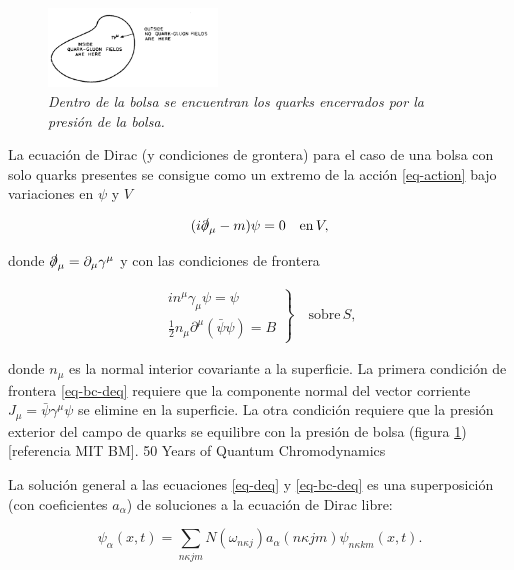 \begin{figure}
\centering
\includegraphics[width=0.4\textwidth]{./Images/Bag model BC.png}
\caption[Diagrama de bolsa con condiciones de grontera]{\emph{Dentro de la bolsa se encuentran los quarks encerrados por la presión de la bolsa.}}
\label{fig: Bolsa BC}
\end{figure}

La ecuación de Dirac (y condiciones de grontera) para el caso de una bolsa con solo quarks presentes se consigue como un extremo de la acción \eqref{eq-action} bajo variaciones en $\psi$ y $V$

\begin{equation}\label{eq-deq}
( i \slashed{\partial}_{\mu} - m) \psi= 0 \quad \mathrm{en} \, V,
\end{equation}

donde $\slashed{\partial}_{\mu} = {\partial}_{\mu} {\gamma}^{\mu}$ y con las condiciones de frontera

\begin{eqnarray}\label{eq-bc-deq}
\left.
\begin{array}{c}
i {n}^{\mu} {\gamma}_{\mu} \psi = \psi \\ 
\frac{1}{2} {n}_{\mu} {\partial}^{\mu}(\bar{\psi} \psi) = B
\end{array} 
\right\rbrace  \quad \mathrm{sobre} \, S,
\end{eqnarray}

donde ${n}_{\mu}$ es la normal interior covariante a la superficie. La primera condición de frontera \eqref{eq-bc-deq} requiere que la componente normal del vector corriente ${J}_{\mu}=\bar{\psi}{\gamma}^{\mu}{\psi}$ se elimine en la superficie. La otra condición requiere que la presión exterior del campo de quarks se equilibre con la presión de bolsa (figura \ref{fig: Bolsa BC})[referencia MIT BM].
50 Years of Quantum Chromodynamics

La solución general a las ecuaciones \eqref{eq-deq} y \eqref{eq-bc-deq} es una superposición (con coeficientes ${a}_{\alpha}$) de soluciones a la ecuación de Dirac libre:

\begin{equation}
{\psi}_{\alpha}(x,t) = \sum_{n \kappa j m} N ({\omega}_{n \kappa j}) {a}_{\alpha} (n \kappa j m) {\psi}_{n \kappa k m} (x, t).
\end{equation}

